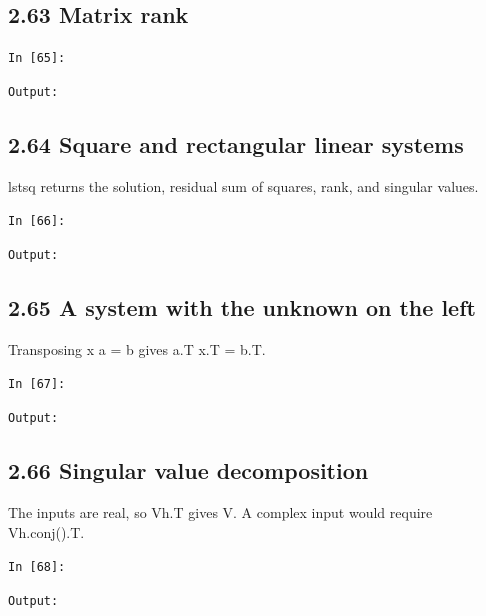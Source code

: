 \documentclass[11pt]{article}
\begin{document}
\par\medskip\noindent\begin{minipage}{\linewidth}
\subsection*{2.63 Matrix rank}
\noindent\texttt{In [65]:}

\noindent\texttt{Output:}

\end{minipage}\par

\par\medskip\noindent\begin{minipage}{\linewidth}
\subsection*{2.64 Square and rectangular linear systems}
lstsq returns the solution, residual sum of squares, rank, and singular values.

\noindent\texttt{In [66]:}

\noindent\texttt{Output:}

\end{minipage}\par

\par\medskip\noindent\begin{minipage}{\linewidth}
\subsection*{2.65 A system with the unknown on the left}
Transposing x a = b gives a.T x.T = b.T.

\noindent\texttt{In [67]:}

\noindent\texttt{Output:}

\end{minipage}\par

\par\medskip\noindent\begin{minipage}{\linewidth}
\subsection*{2.66 Singular value decomposition}
The inputs are real, so Vh.T gives V. A complex input would require Vh.conj().T.

\noindent\texttt{In [68]:}

\noindent\texttt{Output:}

\end{minipage}\par
\end{document}
